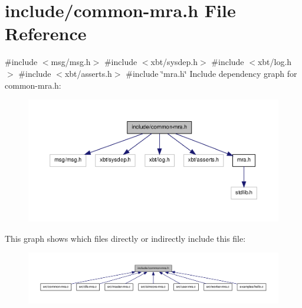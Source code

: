 \hypertarget{common-mra_8h}{\section{include/common-\/mra.h \-File \-Reference}
\label{common-mra_8h}
}
{\ttfamily \#include $<$msg/msg.\-h$>$}\*
{\ttfamily \#include $<$xbt/sysdep.\-h$>$}\*
{\ttfamily \#include $<$xbt/log.\-h$>$}\*
{\ttfamily \#include $<$xbt/asserts.\-h$>$}\*
{\ttfamily \#include \char`\"{}mra.\-h\char`\"{}}\*
\-Include dependency graph for common-\/mra.h\-:\nopagebreak
\begin{figure}[H]
\begin{center}
\leavevmode
\includegraphics[width=350pt]{common-mra_8h__incl}
\end{center}
\end{figure}
\-This graph shows which files directly or indirectly include this file\-:\nopagebreak
\begin{figure}[H]
\begin{center}
\leavevmode
\includegraphics[width=350pt]{common-mra_8h__dep__incl}
\end{center}
\end{figure}

